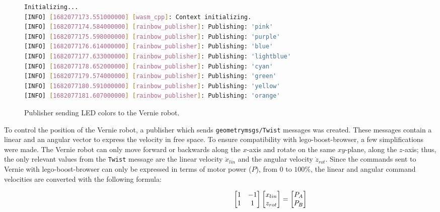 \begin{figure}[htbp]
            \begin{lstlisting}[language=Bash]
Initializing...
[INFO] [1682077173.551000000] [wasm_cpp]: Context initializing.
[INFO] [1682077174.584000000] [rainbow_publisher]: Publishing: 'pink'
[INFO] [1682077175.598000000] [rainbow_publisher]: Publishing: 'purple'
[INFO] [1682077176.614000000] [rainbow_publisher]: Publishing: 'blue'
[INFO] [1682077177.633000000] [rainbow_publisher]: Publishing: 'lightblue'
[INFO] [1682077178.652000000] [rainbow_publisher]: Publishing: 'cyan'
[INFO] [1682077179.574000000] [rainbow_publisher]: Publishing: 'green'
[INFO] [1682077180.591000000] [rainbow_publisher]: Publishing: 'yellow'
[INFO] [1682077181.607000000] [rainbow_publisher]: Publishing: 'orange'
\end{lstlisting}
            \caption{Publisher sending \ac{LED} colors to the Vernie robot.}
            \label{fig:rainbow}
        \end{figure}


        To control the position of the Vernie robot, a publisher which sends \texttt{geometry\smallunderscore  msgs/Twist} messages was created. These messages contain a linear and an angular vector to express the velocity in free space. To ensure compatibility with \textsf{lego-boost-browser}, a few simplifications were made. The Vernie robot can only move forward or backwards along the $x$-axis and rotate on the same $xy$-plane, along the $z$-axis; thus, the only relevant values from the \texttt{Twist} message are the linear velocity $\dot{x}_{lin}$ and the angular velocity $\dot{z}_{rot}$. Since the commands sent to Vernie with \textsf{lego-boost-browser} can only be expressed in terms of motor power ($P$), from 0 to $100\%$, the linear and angular command velocities are converted with the following formula:
        
        \begin{equation}
            \hskip 5cm
            \begin{bmatrix}
                1 & -1 \\
                1 & 1
            \end{bmatrix}
            \begin{bmatrix}
                x_{lin} \\
                z_{rot}
            \end{bmatrix}
            =
            \begin{bmatrix}
                P_A \\
                P_B
            \end{bmatrix}
        \end{equation}

